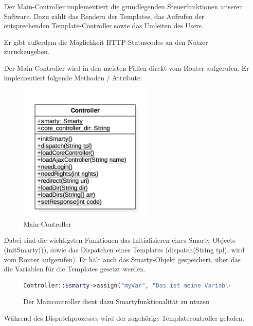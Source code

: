 Der Main-Controller implementiert die grundlegenden Steuerfunktionen 
unserer Software. Dazu zählt das Rendern der Templates, das Aufrufen der entsprechenden Template-Controller sowie das Umleiten des Users.

\pm

Er gibt außerdem die Möglichkeit HTTP-Statuscodes an den Nutzer zurückzugeben.

\pm

Der Main Controller wird in den meisten Fällen direkt vom Router aufgerufen. Er implementiert folgende Methoden / Attribute:

\begin{figure}[h!]
		\centering
        \includegraphics[width=0.6\textwidth]{./Includes/Software/Controller.png}
    \caption{Main-Controller}
\end{figure}

Dabei sind die wichtigsten Funktionen das Initialisieren eines Smarty Objects (initSmarty()), sowie das Dispatchen eines Templates (dispatch(String tpl), wird vom Router aufgerufen). Er hält auch das Smarty-Objekt gespeichert, über das die Variablen für die Templates gesetzt werden.

\begin{figure}[h!]
	\centering
	\begin{lstlisting}[language=php]
	Controller::$smarty->assign("myVar", "Das ist meine Variable")	
	\end{lstlisting}
	\caption{Der Maincontroller dient dazu Smartyfunktionalität zu ntuzen}
\end{figure}


\pm

Während des Dispatchprozesses wird der zugehörige Templatecontroller geladen.


